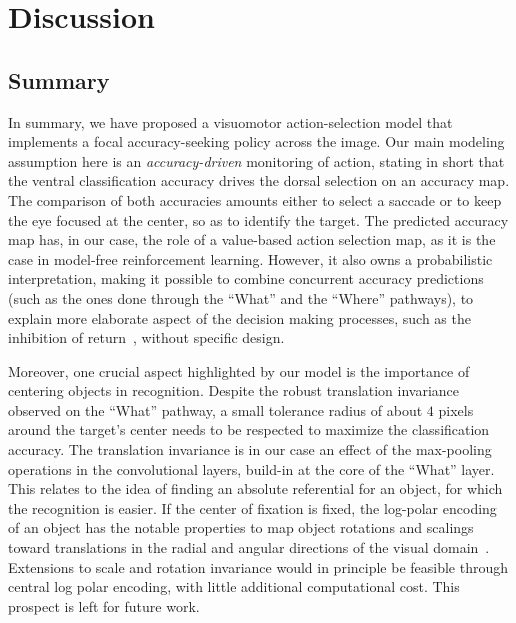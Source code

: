 \section{Discussion} \label{sec:discussion}
\subsection{Summary}

In summary, we have proposed a visuomotor action-selection model that implements a focal accuracy-seeking policy across the image. Our main modeling assumption here is an \emph{accuracy-driven} monitoring of action, stating in short that the ventral classification accuracy drives the dorsal selection on an accuracy map. The comparison of both accuracies amounts either to select a saccade or to keep the eye focused at the center, so as to identify the target. The predicted accuracy map has, in our case, the role of a value-based action selection map, as it is the case in model-free reinforcement learning.
However, it also owns a probabilistic interpretation, making it possible to combine concurrent accuracy predictions (such as the ones done through the ``What'' and the ``Where'' pathways), to explain more elaborate aspect of the decision making processes, such as the inhibition of return~\cite{Itti01}, without specific design.  	

Moreover, one crucial aspect highlighted by our model is the importance of centering objects in recognition. Despite the robust translation invariance observed on the ``What'' pathway, a small tolerance radius of about $4$ pixels around the target's center needs to be respected to maximize the classification accuracy. The translation invariance is in our case an effect of the max-pooling operations in the convolutional layers, build-in at the core of the ``What'' layer.
This relates to the idea of finding an absolute referential for an object, for which the recognition is easier. If the center of fixation is fixed, the log-polar encoding of an object has the notable properties to map object rotations and scalings toward translations in the radial and angular directions of the visual domain~\cite{Traver10}. Extensions to scale and rotation invariance would in principle be feasible through central log polar encoding, with little additional computational cost. This prospect is left for future work.



